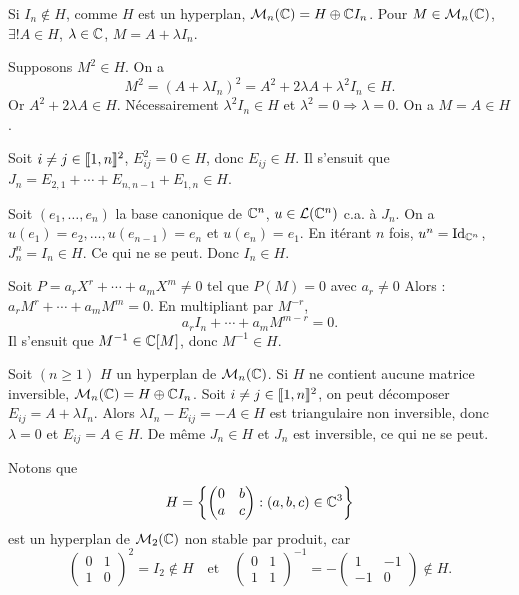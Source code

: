 \begin{solution}
Si $I_n\notin H$, comme $H$ est un hyperplan, $\mathcal M_n(\mathbb C)=H\oplus\mathbb C I_n$. Pour
$M\in\mathcal M_n(\mathbb C)$, $\exists!A\in H$, $\lambda\in\mathbb C$, $M=A+\lambda I_n$.

Supposons $M^2\in H$. On a
\[
M^2=(A+\lambda I_n)^2=A^2+2\lambda A+\lambda^2I_n\in H.
\]
Or $A^2+2\lambda A\in H$. Nécessairement $\lambda^2I_n\in H$ et
$\lambda^2=0\Longrightarrow\lambda=0$. On a $M=A\in H$.

Soit $i\neq j\in\llbracket 1,n\rrbracket^2$, $E_{ij}^2=0\in H$, donc $E_{ij}\in H$. Il
s'ensuit que $J_n=E_{2,1}+\cdots+E_{n,n-1}+E_{1,n}\in H$.

Soit $(e_1,\ldots,e_n)$ la base canonique de $\mathbb C^n$, $u\in\mathcal L(\mathbb C^n)$ c.a. à $J_n$.
On a $u(e_1)=e_2,\ldots,u(e_{n-1})=e_n$ et $u(e_n)=e_1$. En itérant $n$ fois,
$u^n=\operatorname{Id}_{\mathbb C^n}$, $J_n^n=I_n\in H$. Ce qui ne se peut. Donc $I_n\in H$.

Soit $P=a_rX^r+\cdots+a_mX^m\neq0$ tel que $P(M)=0$ avec $a_r\neq0$ Alors :
$a_rM^r+\cdots+a_mM^m=0$. En multipliant par $M^{-r}$,
\[
a_rI_n+\cdots+a_mM^{m-r}=0.
\]
Il s'ensuit que $M^{-1}\in\mathbb C[M]$, donc $M^{-1}\in H$.

\begin{remarkbox}
Soit $(n\geq1)$ $H$ un hyperplan de $\mathcal M_n(\mathbb C)$. Si $H$ ne contient aucune matrice
inversible, $\mathcal M_n(\mathbb C)=H\oplus\mathbb C I_n$. Soit
$i\neq j\in\llbracket 1,n\rrbracket^2$, on peut décomposer $E_{ij}=A+\lambda I_n$. Alors
$\lambda I_n-E_{ij}=-A\in H$ est triangulaire non inversible, donc $\lambda=0$ et
$E_{ij}=A\in H$. De même $J_n\in H$ et $J_n$ est inversible, ce qui ne se peut.

Notons que
\[
H=\left\{\begin{pmatrix}0&b\\a&c\end{pmatrix}:(a,b,c)\in\mathbb C^3\right\}
\]
est un hyperplan de $\mathcal M_2(\mathbb C)$ non stable par produit, car
\[
\begin{pmatrix}0&1\\1&0\end{pmatrix}^2=I_2\notin H
\quad\text{et}\quad
\begin{pmatrix}0&1\\1&1\end{pmatrix}^{-1}
=-\begin{pmatrix}1&-1\\-1&0\end{pmatrix}\notin H.
\]
\end{remarkbox}
\end{solution}

